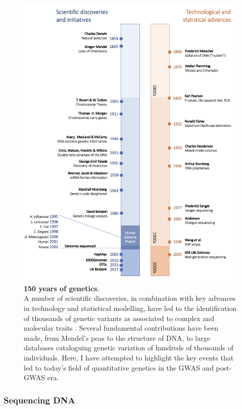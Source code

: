 \begin{figure}[htbp]
\centering
\includegraphics[width=15cm]{Chapter1/Fig/genetic_timeline_draft.png}
\caption[Genetic Timeline]{\textbf{150 years of genetics}.\\
A number of scientific discoveries, in combination with key advances in technology and statistical modelling, have led to the identification of thousands of genetic variants as associated to complex and molecular traits \cite{nhgri2003genetic}.
Several fundamental contributions have been made, from Mendel's peas to the structure of DNA, to large databases cataloguing genetic variation of hundreds of thousands of individuals.
Here, I have attempted to highlight the key events that led to today's field of quantitative genetics in the GWAS and post-GWAS era.}
\label{fig:genetic_timeline}
\end{figure}

\subsubsection{Sequencing DNA}

